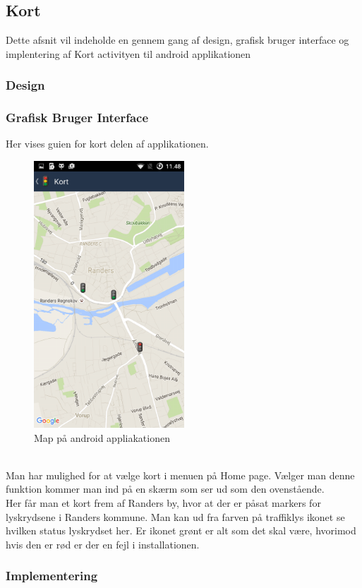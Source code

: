 \subsection{Kort}
	Dette afsnit vil indeholde en gennem gang af design, grafisk bruger interface og implentering af Kort activityen til android applikationen
	
	\subsubsection{Design}

	\subsubsection{Grafisk Bruger Interface}
	Her vises guien for kort delen af applikationen.
	\begin{figure} [!ht]
		\begin{center}
			\includegraphics[height=10cm]{Android/Billeder/AndroidMap}
		\end{center}
		\caption{Map på android appliakationen}
		\label{fig:Map på android appliakationen}
	\end{figure} \\
	Man har mulighed for at vælge kort i menuen på Home page. Vælger man denne funktion kommer man ind på en skærm som ser ud som den ovenstående.\\
	Her får man et kort frem af Randers by, hvor at der er påsat markers for lyskrydsene i Randers kommune. Man kan ud fra farven på traffiklys ikonet se hvilken status lyskrydset her. Er ikonet grønt er alt som det skal være, hvorimod hvis den er rød er der en fejl i installationen.
		
	\subsubsection{Implementering}
	
	\pagebreak